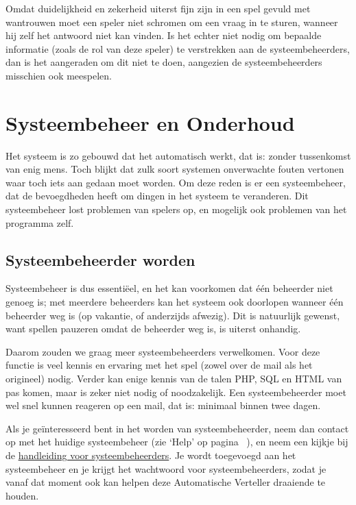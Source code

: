 \documentclass[12pt]{article}
\begin{document}
    Omdat duidelijkheid en zekerheid uiterst fijn zijn in een spel gevuld met wantrouwen moet een speler niet schromen om een vraag in te sturen, wanneer hij zelf het antwoord niet kan vinden. Is het echter niet nodig om bepaalde informatie (zoals de rol van deze speler) te verstrekken aan de systeembeheerders, dan is het aangeraden om dit niet te doen, aangezien de systeembeheerders misschien ook meespelen.

\section{Systeembeheer en Onderhoud}

  Het systeem is zo gebouwd dat het automatisch werkt, dat is: zonder tussenkomst van enig mens. Toch blijkt dat zulk soort systemen onverwachte fouten vertonen waar toch iets aan gedaan moet worden. Om deze reden is er een systeembeheer, dat de bevoegdheden heeft om dingen in het systeem te veranderen. Dit systeembeheer lost problemen van spelers op, en mogelijk ook problemen van het programma zelf.
  
  \subsection{Systeembeheerder worden}
  
  Systeembeheer is dus essenti\"eel, en het kan voorkomen dat \'e\'en beheerder niet genoeg is; met meerdere beheerders kan het systeem ook doorlopen wanneer \'e\'en beheerder weg is (op vakantie, of anderzijds afwezig). Dit is natuurlijk gewenst, want spellen pauzeren omdat de beheerder weg is, is uiterst onhandig.  
  
  Daarom zouden we graag meer systeembeheerders verwelkomen. Voor deze functie is veel kennis en ervaring met het spel (zowel over de mail als het origineel) nodig. Verder kan enige kennis van de talen PHP, SQL en HTML van pas komen, maar is zeker niet nodig of noodzakelijk. Een systeembeheerder moet wel snel kunnen reageren op een mail, dat is: minimaal binnen twee dagen.
  
  Als je ge\"interesseerd bent in het worden van systeembeheerder, neem dan contact op met het huidige systeembeheer (zie `Help' op pagina~\pageref{subsec:help} ), en neem een kijkje bij de \href{http://www.liacs.nl/~vdekker/WW/pdf/manAdmin.pdf}{handleiding voor systeembeheerders}. Je wordt toegevoegd aan het systeembeheer en je krijgt het wachtwoord voor systeembeheerders, zodat je vanaf dat moment ook kan helpen deze Automatische Verteller draaiende te houden.
\end{document}
